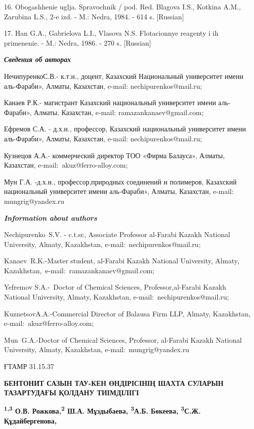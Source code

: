 16. Obogashhenie uglja. Spravochnik / pod. Red. Blagova I.S., Kotkina
A.M., Zarubina L.S., 2-e izd. - M.: Nedra, 1984. - 614 s. {[}Russian{]}

17. Han G.A., Gabrielova L.I., Vlasova N.S. Flotacionnye reagenty i ih
primenenie. - M.: Nedra, 1986. - 270 s. {[}Russian{]}

\emph{\textbf{Сведения об авторах}}

НечипуренкоС.В.- к.т.н., доцент, Казахский Национальный университет
имени аль-Фараби», Алматы, Казахстан, e-mail: nechipurenkos@mail.ru;

Канаев Р.К.- магистрант Казахский национальный университет имени
аль-Фараби», Алматы, Казахстан, e-mail: ramazankanaev@gmail.com;

Ефремов С.А. - д.х.н., профессор, Казахский национальный университет
имени аль-Фараби», Алматы, Казахстан, e-mail: nechipurenkos@mail.ru;

Кузнецов А.А.- коммерческий директор ТОО «Фирма Балауса», Алматы,
Казахстан, e-mail:~akuz@ferro-alloy.com;

Мун Г.А. -д.х.н., профессор,природных соединений и полимеров, Казахский
национальный университет имени аль-Фараби», Алматы, Казахстан, e-mail:
mungrig@yandex.ru

\emph{\textbf{Information about authors}}

Nechipurenko~S.V. - c.t.sc, Associate Professor al-Farabi Kazakh
National University, Almaty, Kazakhstan, e-mail:~nechipurenkos@mail.ru;

Kanaev~R.K.-Master student, al-Farabi Kazakh National University,
Almaty, Kazakhstan,~e-mail:~ramazankanaev@gmail.com;

Yefremov S.A.-~Doctor of Chemical Sciences, Professor,al-Farabi Kazakh
National University, Almaty, Kazakhstan, e-mail:~nechipurenkos@mail.ru;

KuznetsovA.A.-Commercial Director of Balausa Firm LLP, Almaty,
Kazakhstan, e-mail:~akuz@ferro-alloy.com;

Mun~G.A.-Doctor of Chemical Sciences, Professor, al-Farabi Kazakh
National University, Almaty, Kazakhstan, e-mail:~mungrig@yandex.ru

ҒТАМР 31.15.37

\textbf{БЕНТОНИТ САЗЫН ТАУ-КЕН ӨНДІРІСІНІҢ ШАХТА СУЛАРЫН ТАЗАРТУДАҒЫ
ҚОЛДАНУ ТИІМДІЛІГІ}

\textbf{\textsuperscript{1,3} О.В. Рожкова,\textsuperscript{2} Ш.А.
Мұздыбаева, \textsuperscript{3}А.Б. Бөкеева, \textsuperscript{3}С.Ж.
Құдайбергенова,}

